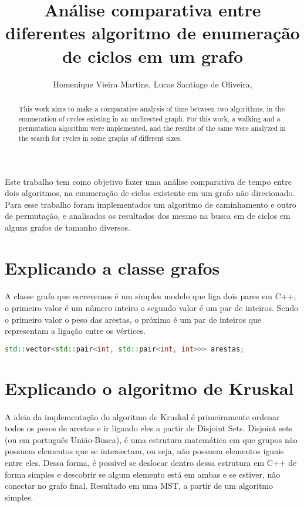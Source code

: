 \documentclass[12pt]{article}
\title{Análise comparativa entre diferentes algoritmo de enumeração de ciclos em um grafo}
\author{Homenique Vieira Martins\inst{1}, Lucas Santiago de Oliveira\inst{2},}
\begin{document}
 
    \maketitle

    \begin{abstract} 
        This work aims to make a comparative analysis of time between two algorithms,
        in the enumeration of cycles existing in an undirected graph. For this work, 
        a walking and a permutation algorithm were implemented, and the results of the
        same were analyzed in the search for cycles in some graphs of different sizes.
      \end{abstract}
    
      \begin{resumo} 
        Este trabalho tem como objetivo fazer uma análise comparativa de tempo entre dois algoritmos, 
        na enumeração de ciclos existente em um grafo não direcionado. Para esse trabalho foram implementados
        um algoritmo de caminhamento e outro de permutação, e analisados os resultados dos mesmo na busca em de 
        ciclos em alguns grafos de tamanho diversos.
      \end{resumo}
    
    \section{Explicando a classe grafos} \label{sec:graph}
      \paragraph{}A classe grafo que escrevemos é um simples modelo que liga dois pares em C++,
        o primeiro valor é um número inteiro o segundo valor é um par de inteiros. 
        Sendo o primeiro valor o peso das arestas, o próximo é um par de inteiros que
        representam a ligação entre os vértices.

        \begin{lstlisting}[language=c++]
        std::vector<std::pair<int, std::pair<int, int>>> arestas;
        \end{lstlisting}


        \section{Explicando o algoritmo de Kruskal} \label{sec:Kruskal}
        \paragraph{} A ideia da implementação do algoritmo de Kruskal é primeiramente ordenar 
         todos os pesos de arestas e ir ligando eles a partir de Disjoint Sets. Disjoint sets 
         (ou em português União-Busca), é uma estrutura matemática em que grupos não possuem
         elementos que se intersectam, ou seja, não possuem elementos iguais entre eles. Dessa forma,
         é possível se deslocar dentro dessa estrutura em C++ de forma simples e descobrir se algum 
         elemento está em ambas e se estiver, não conectar no grafo final. Resultado em uma MST, 
         a partir de um algoritmo simples.
     
\end{document}

